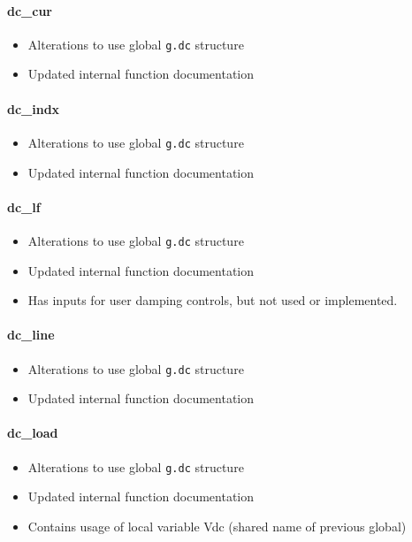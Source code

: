 \documentclass[12pt]{article}
\begin{document}
\paragraph{dc\_cur}
	\begin{itemize}
		\item Alterations to use global \verb|g.dc| structure
		\item Updated internal function documentation
	\end{itemize}

\paragraph{dc\_indx}
	\begin{itemize}
		\item Alterations to use global \verb|g.dc| structure
		\item Updated internal function documentation
	\end{itemize}

\paragraph{dc\_lf}
	\begin{itemize}
		\item Alterations to use global \verb|g.dc| structure
		\item Updated internal function documentation
		\item Has inputs for user damping controls, but not used or implemented.
	\end{itemize}

\paragraph{dc\_line}
	\begin{itemize}
		\item Alterations to use global \verb|g.dc| structure
		\item Updated internal function documentation
	\end{itemize}

\paragraph{dc\_load}
	\begin{itemize}
		\item Alterations to use global \verb|g.dc| structure
		\item Updated internal function documentation
		\item Contains usage of local variable Vdc (shared name of previous global)
	\end{itemize}
\end{document}
